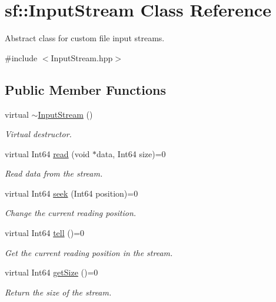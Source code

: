 \hypertarget{classsf_1_1InputStream}{\section{sf\-:\-:Input\-Stream Class Reference}
\label{classsf_1_1InputStream}
}


Abstract class for custom file input streams.  




{\ttfamily \#include $<$Input\-Stream.\-hpp$>$}

\subsection*{Public Member Functions}
\begin{DoxyCompactItemize}
\item 
\hypertarget{classsf_1_1InputStream_a4b2eb0f92323e630bd0542bc6191682e}{virtual \hyperlink{classsf_1_1InputStream_a4b2eb0f92323e630bd0542bc6191682e}{$\sim$\-Input\-Stream} ()}\label{classsf_1_1InputStream_a4b2eb0f92323e630bd0542bc6191682e}

\begin{DoxyCompactList}\small\item\em Virtual destructor. \end{DoxyCompactList}\item 
virtual Int64 \hyperlink{classsf_1_1InputStream_a8dd89c74c1acb693203f50e750c6ae53}{read} (void $\ast$data, Int64 size)=0
\begin{DoxyCompactList}\small\item\em Read data from the stream. \end{DoxyCompactList}\item 
virtual Int64 \hyperlink{classsf_1_1InputStream_a76aba8e5d5cf9b1c5902d5e04f7864fc}{seek} (Int64 position)=0
\begin{DoxyCompactList}\small\item\em Change the current reading position. \end{DoxyCompactList}\item 
virtual Int64 \hyperlink{classsf_1_1InputStream_a599515b9ccdbddb6fef5a98424fd559c}{tell} ()=0
\begin{DoxyCompactList}\small\item\em Get the current reading position in the stream. \end{DoxyCompactList}\item 
virtual Int64 \hyperlink{classsf_1_1InputStream_a311eaaaa65d636728e5153b574b72d5d}{get\-Size} ()=0
\begin{DoxyCompactList}\small\item\em Return the size of the stream. \end{DoxyCompactList}\end{DoxyCompactItemize}


